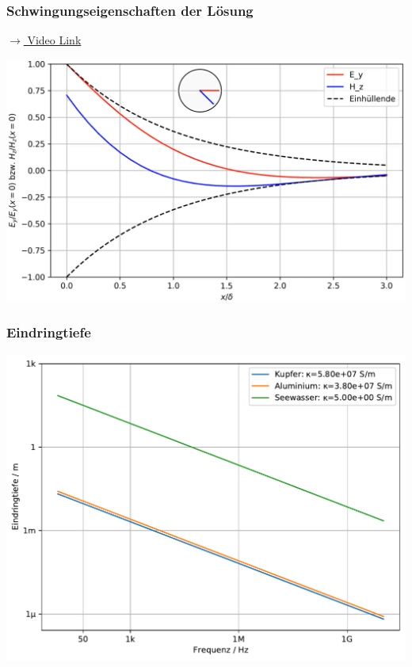 \begin{frame}
  \frametitle{Schwingungseigenschaften der Lösung}
  \href{https://bildungsportal.sachsen.de/opal/auth/RepositoryEntry/27455913992/CourseNode/103138906469436/Theoretische\%20Elektrotechnik/Quasistationäre\%20Felder/ey_hz.mp4}{$\to$ Video Link}
  \bigskip
  
  \centering
\includegraphics[width=.95\linewidth]{programs/Skin-Effect/ey_hz.png}
\end{frame}


\begin{frame}
  \frametitle{Eindringtiefe}
  \centering
\includegraphics[width=.85\linewidth]{programs/Skin-Effect/skin_depth.pdf}
\end{frame}

